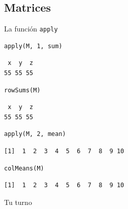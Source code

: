 \documentclass[xcolor={usenames,svgnames,dvipsnames}]{beamer}
\begin{document}
\subsection{Matrices}
\label{sec-4-1}
\begin{frame}[fragile,label=sec-4-1-1]{La función \texttt{apply}}
 \lstset{language=R,label= ,caption= ,numbers=none}
\begin{lstlisting}
apply(M, 1, sum)
\end{lstlisting}

\begin{verbatim}
 x  y  z 
55 55 55
\end{verbatim}

\lstset{language=R,label= ,caption= ,numbers=none}
\begin{lstlisting}
rowSums(M)
\end{lstlisting}

\begin{verbatim}
 x  y  z 
55 55 55
\end{verbatim}

\lstset{language=R,label= ,caption= ,numbers=none}
\begin{lstlisting}
apply(M, 2, mean)
\end{lstlisting}

\begin{verbatim}
[1]  1  2  3  4  5  6  7  8  9 10
\end{verbatim}

\lstset{language=R,label= ,caption= ,numbers=none}
\begin{lstlisting}
colMeans(M)
\end{lstlisting}

\begin{verbatim}
[1]  1  2  3  4  5  6  7  8  9 10
\end{verbatim}
\end{frame}

\begin{frame}[label=sec-4-1-2]{Tu turno}
\end{frame}
\end{document}
